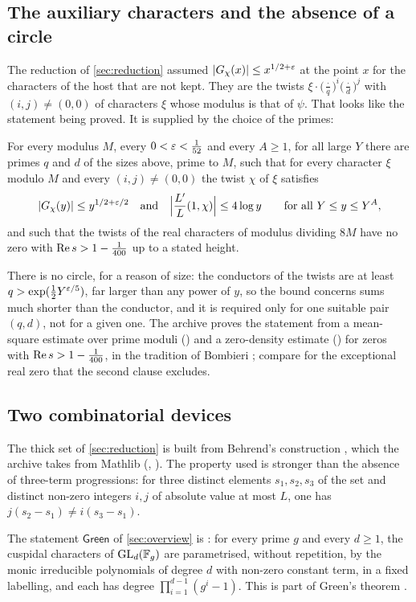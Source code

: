 \subsection{The auxiliary characters and the absence of a circle}
The reduction of \cref{sec:reduction} assumed $\lvert G_\chi(x)\rvert\le x^{1/2+\varepsilon}$ at the point
$x$ for the characters of the host that are not kept. They are the twists
$\xi\cdot\bigl(\tfrac\cdot q\bigr)^i\bigl(\tfrac\cdot d\bigr)^j$ with $(i,j)\ne(0,0)$ of
characters $\xi$ whose modulus is that of $\psi$. That looks like the statement being proved.
It is supplied by the choice of the primes:
\begin{statement}\label{st:pairs}
For every modulus $M$, every $0<\varepsilon<\tfrac1{52}$ and every $A\ge1$, for all large $Y$ there
are primes $q$ and $d$ of the sizes above, prime to $M$, such that for every character $\xi$
modulo $M$ and every $(i,j)\neq(0,0)$ the twist $\chi$ of $\xi$ satisfies
\[
\lvert G_\chi(y)\rvert\le y^{1/2+\varepsilon/2}\quad\text{and}\quad
\Bigl|\frac{L'}{L}(1,\chi)\Bigr|\le4\log y\qquad\text{for all } Y\le y\le Y^{A},
\]
and such that the twists of the real characters of modulus dividing $8M$ have no zero with
$\operatorname{Re} s>1-\tfrac1{400}$ up to a stated height.
\end{statement}
There is no circle, for a reason of size: the conductors of the twists are at least
$q>\exp(\tfrac12Y^{\varepsilon/5})$, far larger than any power of $y$, so the bound concerns sums much
shorter than the conductor, and it is required only for one suitable pair $(q,d)$, not for a
given one. The archive proves the statement from a mean-square estimate over prime moduli
\lvS{} () and a zero-density estimate \lvS{} () for zeros
with $\operatorname{Re} s>1-\tfrac1{400}$, in the tradition of Bombieri \cite{bombieri1965}; compare
\cite{siegel1935,page1935} for the exceptional real zero that the second clause excludes.

\subsection{Two combinatorial devices}
The thick set of \cref{sec:reduction} is built from Behrend's construction
\cite{behrend1946}, which the archive takes from Mathlib \lvS{} (,
). The property used is stronger than the absence of three-term
progressions: for three distinct elements $s_1,s_2,s_3$ of the set and distinct non-zero
integers $i,j$ of absolute value at most $L$, one has $j(s_2-s_1)\ne i(s_3-s_1)$.

The statement $\mathsf{Green}$ of \cref{sec:overview} is \lvS: for every prime $g$ and every
$d\ge1$, the cuspidal characters of $\mathrm{GL}_d(\mathbb{F}_g)$ are parametrised, without repetition, by the
monic irreducible polynomials of degree $d$ with non-zero constant term, in a fixed labelling,
and each has degree $\prod_{i=1}^{d-1}(g^i-1)$. This is part of Green's theorem
\cite{green1955}.
